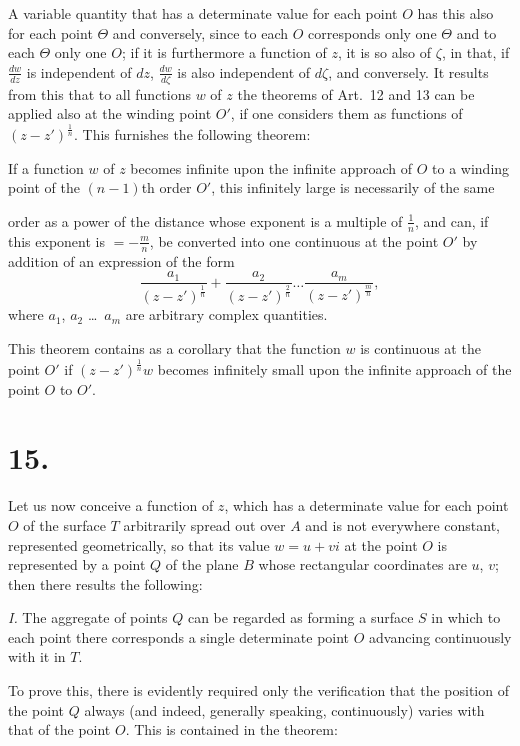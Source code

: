 \documentclass{article}
\begin{document}
A variable quantity that has a determinate value for each point $O$ has this also for each point $\varTheta$ and conversely, since to each $O$ corresponds only one $\varTheta$ and to each $\varTheta$ only one $O$; if it is furthermore a function of $z$, it is so also of $\zeta$, in that, if $\frac{dw}{dz}$ is independent of $dz$, $\frac{dw}{d\zeta}$ is also independent of $d\zeta$, and conversely. It results from this that to all functions $w$ of $z$ the theorems of Art.~12 and 13 can be applied also at the winding point $O'$, if one considers them as functions of $(z - z')^{\frac{1}{n}}$. This furnishes the following theorem:

If a function $w$ of $z$ becomes infinite upon the infinite approach of $O$ to a winding point of the $(n-1)$th order $O'$, this infinitely large is necessarily of the same

order as a power of the distance whose exponent is a multiple of $\frac{1}{n}$, and can, if this exponent is $= -\frac{m}{n}$, be converted into one continuous at the point $O'$ by addition of an expression of the form
\[
\frac{a_1}{(z - z')^{\frac{1}{n}}} + \frac{a_2}{(z - z')^{\frac{2}{n}}} \dots \frac{a_m}{(z - z')^{\frac{m}{n}}},
\]
where $a_1$, $a_2$ \dots\ $a_m$ are arbitrary complex quantities.

This theorem contains as a corollary that the function $w$ is continuous at the point $O'$ if $(z - z')^{\frac{1}{n}} w$ becomes infinitely small upon the infinite approach of the point $O$ to $O'$.

\section*{15.}

Let us now conceive a function of $z$, which has a determinate value for each point $O$ of the surface $T$ arbitrarily spread out over $A$ and is not everywhere constant, represented geometrically, so that its value $w = u + vi$ at the point $O$ is represented by a point $Q$ of the plane $B$ whose rectangular coordinates are $u$, $v$; then there results the following:

\emph{I.} The aggregate of points $Q$ can be regarded as forming a surface $S$ in which to each point there corresponds a single determinate point $O$ advancing continuously with it in $T$.

To prove this, there is evidently required only the verification that the position of the point $Q$ always (and indeed, generally speaking, continuously) varies with that of the point $O$. This is contained in the theorem:
\end{document}
